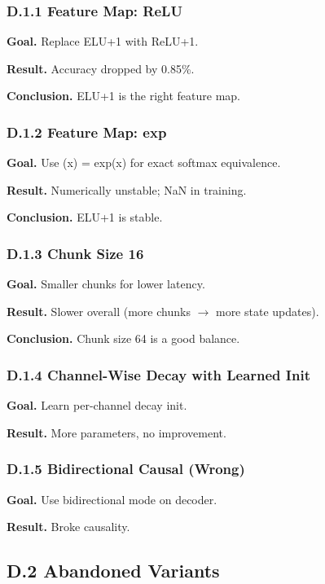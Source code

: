\subsubsection{D.1.1 Feature Map: ReLU}

\textbf{Goal.} Replace ELU+1 with ReLU+1.

\textbf{Result.} Accuracy dropped by 0.85\%.

\textbf{Conclusion.} ELU+1 is the right feature map.

\subsubsection{D.1.2 Feature Map: exp}

\textbf{Goal.} Use  (x) = exp(x) for exact softmax equivalence.

\textbf{Result.} Numerically unstable; NaN in training.

\textbf{Conclusion.} ELU+1 is stable.

\subsubsection{D.1.3 Chunk Size 16}

\textbf{Goal.} Smaller chunks for lower latency.

\textbf{Result.} Slower overall (more chunks $\to$ more state updates).

\textbf{Conclusion.} Chunk size 64 is a good balance.

\subsubsection{D.1.4 Channel-Wise Decay with Learned Init}

\textbf{Goal.} Learn per-channel decay init.

\textbf{Result.} More parameters, no improvement.

\subsubsection{D.1.5 Bidirectional Causal (Wrong)}

\textbf{Goal.} Use bidirectional mode on decoder.

\textbf{Result.} Broke causality.

\subsection{D.2 Abandoned Variants}

